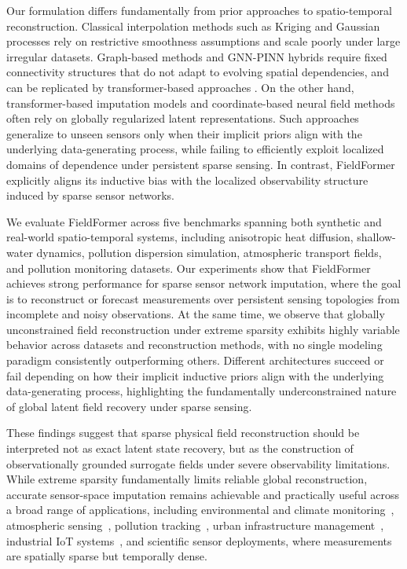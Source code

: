 Our formulation differs fundamentally from prior approaches to spatio-temporal reconstruction. Classical interpolation methods such as Kriging and Gaussian processes rely on restrictive smoothness assumptions and scale poorly under large irregular datasets. Graph-based methods and GNN-PINN hybrids require fixed connectivity structures that do not adapt to evolving spatial dependencies, and can be replicated by transformer-based approaches \citep{joshi2025transformers}. On the other hand, transformer-based imputation models and coordinate-based neural field methods often rely on globally regularized latent representations. Such approaches generalize to unseen sensors only when their implicit priors align with the underlying data-generating process, while failing to efficiently exploit localized domains of dependence under persistent sparse sensing. In contrast, FieldFormer explicitly aligns its inductive bias with the localized observability structure induced by sparse sensor networks.

We evaluate FieldFormer across five benchmarks spanning both synthetic and real-world spatio-temporal systems, including anisotropic heat diffusion, shallow-water dynamics, pollution dispersion simulation, atmospheric transport fields, and pollution monitoring datasets. Our experiments show that FieldFormer achieves strong performance for sparse sensor network imputation, where the goal is to reconstruct or forecast measurements over persistent sensing topologies from incomplete and noisy observations. At the same time, we observe that globally unconstrained field reconstruction under extreme sparsity exhibits highly variable behavior across datasets and reconstruction methods, with no single modeling paradigm consistently outperforming others. Different architectures succeed or fail depending on how their implicit inductive priors align with the underlying data-generating process, highlighting the fundamentally underconstrained nature of global latent field recovery under sparse sensing.

These findings suggest that sparse physical field reconstruction should be interpreted not as exact latent state recovery, but as the construction of observationally grounded surrogate fields under severe observability limitations. While extreme sparsity fundamentally limits reliable global reconstruction, accurate sensor-space imputation remains achievable and practically useful across a broad range of applications, including environmental and climate monitoring~\citep{hart2006environmental}, atmospheric sensing~\citep{cisl_rda_ds083.2}, pollution tracking~\citep{iyer2022modeling,bhardwaj2025comprehensive,concas2021low}, urban infrastructure management~\citep{li2017diffusion,bhardwaj2023understanding}, industrial IoT systems~\citep{khalil2021deep}, and scientific sensor deployments, where measurements are spatially sparse but temporally dense.

